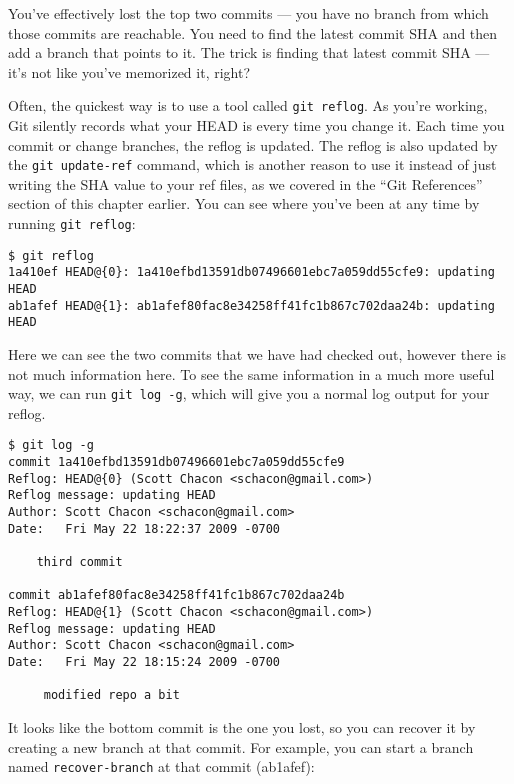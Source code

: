 \documentclass[a4paper]{book}
\begin{document}
You've effectively lost the top two commits --- you have no branch from which those commits are reachable. You need to find the latest commit SHA and then add a branch that points to it. The trick is finding that latest commit SHA --- it's not like you've memorized it, right?

Often, the quickest way is to use a tool called \texttt{git reflog}. As you're working, Git silently records what your HEAD is every time you change it. Each time you commit or change branches, the reflog is updated. The reflog is also updated by the \texttt{git update-ref} command, which is another reason to use it instead of just writing the SHA value to your ref files, as we covered in the “Git References” section of this chapter earlier. You can see where you've been at any time by running \texttt{git reflog}:

\begin{shaded}\begin{verbatim}
$ git reflog
1a410ef HEAD@{0}: 1a410efbd13591db07496601ebc7a059dd55cfe9: updating HEAD
ab1afef HEAD@{1}: ab1afef80fac8e34258ff41fc1b867c702daa24b: updating HEAD
\end{verbatim}\end{shaded}

Here we can see the two commits that we have had checked out, however there is not much information here. To see the same information in a much more useful way, we can run \texttt{git log -g}, which will give you a normal log output for your reflog.

\begin{shaded}\begin{verbatim}
$ git log -g
commit 1a410efbd13591db07496601ebc7a059dd55cfe9
Reflog: HEAD@{0} (Scott Chacon <schacon@gmail.com>)
Reflog message: updating HEAD
Author: Scott Chacon <schacon@gmail.com>
Date:   Fri May 22 18:22:37 2009 -0700

    third commit

commit ab1afef80fac8e34258ff41fc1b867c702daa24b
Reflog: HEAD@{1} (Scott Chacon <schacon@gmail.com>)
Reflog message: updating HEAD
Author: Scott Chacon <schacon@gmail.com>
Date:   Fri May 22 18:15:24 2009 -0700

     modified repo a bit
\end{verbatim}\end{shaded}

It looks like the bottom commit is the one you lost, so you can recover it by creating a new branch at that commit. For example, you can start a branch named \texttt{recover-branch} at that commit (ab1afef):
\end{document}
